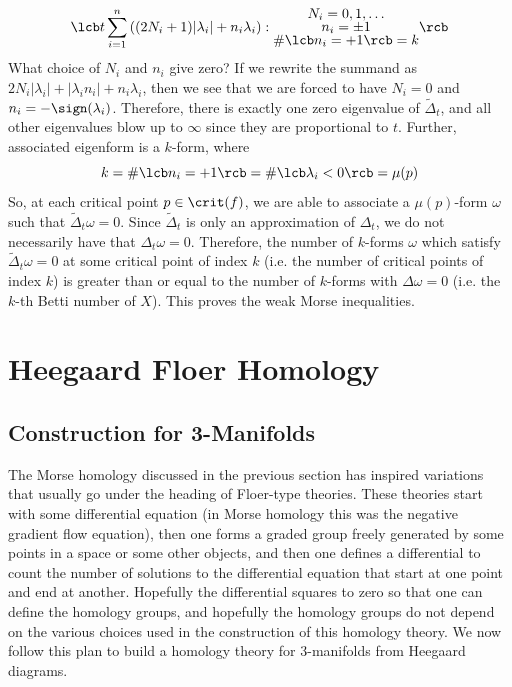 \[ \lcb t \sum_{i=1}^n \left( (2N_i+1)|\lambda_i| + n_i \lambda_i \right) : \substack{\displaystyle N_i=0,1,\ldots \\ \displaystyle n_i = \pm 1 \\ \displaystyle \# \lcb n_i=+1 \rcb = k} \rcb \]
What choice of $N_i$ and $n_i$ give zero? If we rewrite the summand as $2N_i|\lambda_i| + |\lambda_i n_i| + n_i \lambda_i$, then we see that we are forced to have $N_i=0$ and $n_i = -\sign(\lambda_i)$. Therefore, there is exactly one zero eigenvalue of $\widetilde\Delta_t$, and all other eigenvalues blow up to $\infty$ since they are proportional to $t$. Further, associated eigenform is a $k$-form, where
\[ k = \# \lcb n_i = +1 \rcb = \# \lcb \lambda_i < 0 \rcb = \mu(p) \]
So, at each critical point $p \in \crit(f)$, we are able to associate a $\mu(p)$-form $\omega$ such that $\widetilde\Delta_t \omega = 0$. Since $\widetilde\Delta_t$ is only an approximation of $\Delta_t$, we do not necessarily have that $\Delta_t \omega = 0$. Therefore, the number of $k$-forms $\omega$ which satisfy $\widetilde\Delta_t \omega = 0$ at some critical point of index $k$ (i.e. the number of critical points of index $k$) is greater than or equal to the number of $k$-forms with $\Delta\omega = 0$ (i.e. the $k$-th Betti number of $X$). This proves the weak Morse inequalities.













\newpage
\section{Heegaard Floer Homology}
\label{Heegaard Floer Homology}


\subsection{Construction for 3-Manifolds}
\label{Construction for 3-Manifolds}


The Morse homology discussed in the previous section has inspired variations that usually go under the heading of Floer-type theories. These theories start with some differential equation (in Morse homology this was the negative gradient flow equation), then one forms a graded group freely generated by some points in a space or some other objects, and then one defines a differential to count the number of solutions to the differential equation that start at one point and end at another. Hopefully the differential squares to zero so that one can define the homology groups, and hopefully the homology groups do not depend on the various choices used in the construction of this homology theory. We now follow this plan to build a homology theory for 3-manifolds from Heegaard diagrams.

